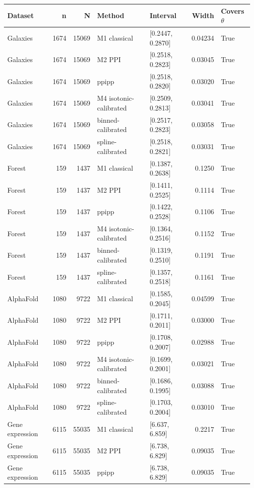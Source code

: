 \begin{tabular}{lrrllrl}
\toprule
Dataset & n & N & Method & Interval & Width & Covers $\theta$ \\
\midrule
Galaxies & 1674 & 15069 & M1 classical & [0.2447, 0.2870] & 0.04234 & True \\
Galaxies & 1674 & 15069 & M2 PPI & [0.2518, 0.2823] & 0.03045 & True \\
Galaxies & 1674 & 15069 & ppipp & [0.2518, 0.2820] & 0.03020 & True \\
Galaxies & 1674 & 15069 & M4 isotonic-calibrated & [0.2509, 0.2813] & 0.03041 & True \\
Galaxies & 1674 & 15069 & binned-calibrated & [0.2517, 0.2823] & 0.03058 & True \\
Galaxies & 1674 & 15069 & spline-calibrated & [0.2518, 0.2821] & 0.03031 & True \\
Forest & 159 & 1437 & M1 classical & [0.1387, 0.2638] & 0.1250 & True \\
Forest & 159 & 1437 & M2 PPI & [0.1411, 0.2525] & 0.1114 & True \\
Forest & 159 & 1437 & ppipp & [0.1422, 0.2528] & 0.1106 & True \\
Forest & 159 & 1437 & M4 isotonic-calibrated & [0.1364, 0.2516] & 0.1152 & True \\
Forest & 159 & 1437 & binned-calibrated & [0.1319, 0.2510] & 0.1191 & True \\
Forest & 159 & 1437 & spline-calibrated & [0.1357, 0.2518] & 0.1161 & True \\
AlphaFold & 1080 & 9722 & M1 classical & [0.1585, 0.2045] & 0.04599 & True \\
AlphaFold & 1080 & 9722 & M2 PPI & [0.1711, 0.2011] & 0.03000 & True \\
AlphaFold & 1080 & 9722 & ppipp & [0.1708, 0.2007] & 0.02988 & True \\
AlphaFold & 1080 & 9722 & M4 isotonic-calibrated & [0.1699, 0.2001] & 0.03021 & True \\
AlphaFold & 1080 & 9722 & binned-calibrated & [0.1686, 0.1995] & 0.03088 & True \\
AlphaFold & 1080 & 9722 & spline-calibrated & [0.1703, 0.2004] & 0.03010 & True \\
Gene expression & 6115 & 55035 & M1 classical & [6.637, 6.859] & 0.2217 & True \\
Gene expression & 6115 & 55035 & M2 PPI & [6.738, 6.829] & 0.09035 & True \\
Gene expression & 6115 & 55035 & ppipp & [6.738, 6.829] & 0.09035 & True \\

\end{tabular}
